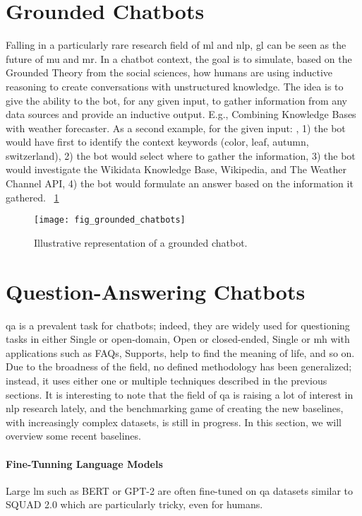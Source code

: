 \section{Grounded Chatbots}
\label{chatbot:grounded}
Falling in a particularly rare research field of \gls{ml} and \gls{nlp}, \gls{gl} can be seen as the future of \gls{mu} and \gls{mr}. In a chatbot context, the goal is to simulate, based on the Grounded Theory from the social sciences, how humans are using inductive reasoning to create conversations with unstructured knowledge. The idea is to give the ability to the bot, for any given input, to gather information from any data sources and provide an inductive output. E.g., Combining Knowledge Bases with weather forecaster. As a second example, for the given input: , 1) the bot would have first to identify the context keywords (color, leaf, autumn, switzerland), 2) the bot would select where to gather the information, 3) the bot would investigate the Wikidata Knowledge Base, Wikipedia, and The Weather Channel API, 4) the bot would formulate an answer based on the information it gathered. ~\ref{fig:fig_grounded_chatbots}

\begin{figure}[H]
    \centering
    \texttt{[image: fig\_grounded\_chatbots]}
    \caption{Illustrative representation of a grounded chatbot.}
    \label{fig:fig_grounded_chatbots}
\end{figure}

\section{Question-Answering Chatbots}
\label{chatbot:qa}
\gls{qa} is a prevalent task for chatbots; indeed, they are widely used for questioning tasks in either Single or \gls{open-domain}, Open or \gls{closed-ended}, Single or \gls{mh} with applications such as FAQs, Supports, help to find the meaning of life, and so on. Due to the broadness of the field, no defined methodology has been generalized; instead, it uses either one or multiple techniques described in the previous sections. It is interesting to note that the field of \gls{qa} is raising a lot of interest in \gls{nlp} research lately, and the benchmarking game of creating the new baselines, with increasingly complex datasets, is still in progress. In this section, we will overview some recent baselines.

\paragraph{Fine-Tunning Language Models} Large \gls{lm} such as BERT \autocite{paper:devlin-etal-2019-bert} or GPT-2 \autocite{papers:gpt2} are often fine-tuned on \gls{qa} datasets similar to SQUAD 2.0 \autocite{paper:rajpurkar-etal-2018-know} which are particularly tricky, even for humans.

